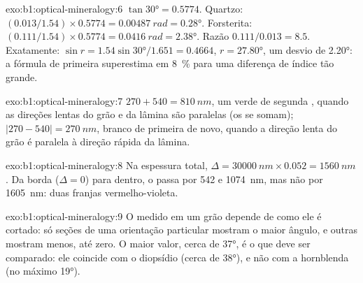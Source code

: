 \begin{solution}{exo:b1:optical-mineralogy:6}
$\tan\ang{30} = 0.5774$. Quartzo: $(0.013/1.54)\times0.5774 = \qty{0.00487}{rad}
= \ang{0.28}$. Forsterita: $(0.111/1.54)\times0.5774 = \qty{0.0416}{rad} =
\ang{2.38}$. Razão $0.111/0.013 = 8.5$. Exatamente: $\sin r = 1.54\sin\ang{30}/1.651
= 0.4664$, $r = \ang{27.80}$, um desvio de \ang{2.20}: a fórmula de primeira  superestima em \qty{8}{\percent} para uma diferença de índice tão grande.
\end{solution}

\begin{solution}{exo:b1:optical-mineralogy:7}
$270 + 540 = \qty{810}{nm}$, um verde de segunda , quando as direções lentas do grão e da lâmina são paralelas (os  se somam); $|270 - 540| =
\qty{270}{nm}$, branco de primeira  de novo, quando a direção lenta do grão é paralela à direção rápida da lâmina.
\end{solution}

\begin{solution}{exo:b1:optical-mineralogy:8}
Na espessura total, $\Delta = \qty{30000}{nm}\times0.052 = \qty{1560}{nm}$. Da borda ($\Delta = 0$) para dentro, o  passa por 542 e
\qty{1074}{nm}, mas não por \qty{1605}{nm}: duas franjas vermelho-violeta.
\end{solution}

\begin{solution}{exo:b1:optical-mineralogy:9}
O  medido em um grão depende de como ele é cortado: só seções de uma orientação particular mostram o maior ângulo, e outras mostram menos, até zero. O maior valor, cerca de \ang{37}, é o que deve ser comparado: ele coincide com o diopsídio (cerca de \ang{38}), e não com a hornblenda (no máximo \ang{19}).
\end{solution}

